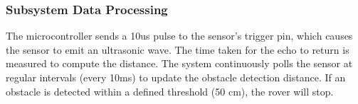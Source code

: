 \subsubsection{Subsystem Data Processing}
The microcontroller sends a 10us pulse to the sensor's trigger pin, which causes the sensor to emit an ultrasonic wave. The time taken for the echo to return is measured to compute the distance. The system continuously polls the sensor at regular intervals (every 10ms) to update the obstacle detection distance. If an obstacle is detected within a defined threshold (50 cm), the rover will stop.
